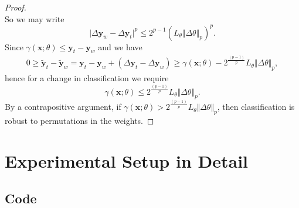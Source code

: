 \documentclass{article}
\theoremstyle{plain}
\theoremstyle{definition}
\theoremstyle{remark}
\begin{document}
\begin{proof}
\[    \]
    So we may write
    \begin{equation}
        \vert \Delta \mathbf{y}_w - \Delta \mathbf{y}_t \vert^p \leq 2^{p-1} (L_\theta \Vert \Delta\theta\Vert_p  )^p.
    \end{equation}
    Since $\gamma(\mathbf x;\theta)  \leq \mathbf{y}_{t} - \mathbf{y}_w$ and we have 
    \begin{align}
        0 \geq \tilde{\mathbf{y}}_t - \tilde{\mathbf{y}}_w = \mathbf{y}_t - \mathbf{y}_w + (\Delta \mathbf{y}_t - \Delta \mathbf{y}_w ) \geq \gamma(\mathbf x;\theta) - 2^\frac{(p-1)}{p }L_\theta \Vert \Delta\theta\Vert_p ,
    \end{align}
    hence for a change in classification we require
    \begin{equation}
        \gamma(\mathbf x;\theta) \leq 2^\frac{(p-1)}{p }L_\theta \Vert \Delta\theta\Vert_p .
    \end{equation}
    By a contrapositive argument, if $\gamma(\mathbf x;\theta)> 2^\frac{(p-1)}{p }L_\theta \Vert \Delta\theta\Vert_p$, then classification is robust to permutations in the weights.

\end{proof}

\section{Experimental Setup in Detail}\label{ap}

\subsection{Code}
\end{document}
